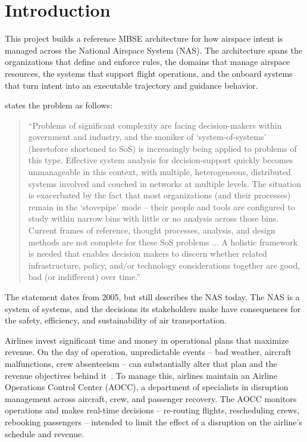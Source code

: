 \section{Introduction}
\label{sec:introduction}


This project builds a reference MBSE architecture for how airspace intent is managed across the National Airspace System (NAS). The architecture spans the organizations that define and enforce rules, the domains that manage airspace resources, the systems that support flight operations, and the onboard systems that turn intent into an executable trajectory and guidance behavior.

\textcite{delaurentis2005sosTransportation} states the problem as follows:

\begin{quote}
``Problems of significant complexity are facing decision-makers within government and industry, and the moniker of `system-of-systems' (heretofore shortened to SoS) is increasingly being applied to problems of this type. Effective system analysis for decision-support quickly becomes unmanageable in this context, with multiple, heterogeneous, distributed systems involved and couched in networks at multiple levels. The situation is exacerbated by the fact that most organizations (and their processes) remain in the `stovepipe' mode -- their people and tools are configured to study within narrow bins with little or no analysis across those bins. Current frames of reference, thought processes, analysis, and design methods are not complete for these SoS problems ... A holistic framework is needed that enables decision makers to discern whether related infrastructure, policy, and/or technology considerations together are good, bad (or indifferent) over time.''
\end{quote}

The statement dates from 2005, but still describes the NAS today. The NAS is a system of systems, and the decisions its stakeholders make have consequences for the safety, efficiency, and sustainability of air transportation.

Airlines invest significant time and money in operational plans that maximize revenue. On the day of operation, unpredictable events -- bad weather, aircraft malfunctions, crew absenteeism -- can substantially alter that plan and the revenue objectives behind it~\cite{castro2013aoccMasThesis}. To manage this, airlines maintain an Airline Operations Control Center (AOCC), a department of specialists in disruption management across aircraft, crew, and passenger recovery. The AOCC monitors operations and makes real-time decisions -- re-routing flights, rescheduling crews, rebooking passengers -- intended to limit the effect of a disruption on the airline's schedule and revenue.

